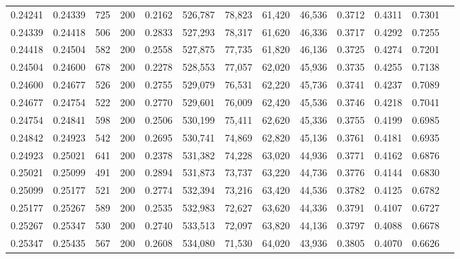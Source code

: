 \begin{tabular}{rrrrrrrrrrrrr}
0.24241 & 0.24339 &    725 & 200 &                                     0.2162 & 526,787 &  78,823 &  61,420 &  46,536 & 0.3712 & 0.4311 & 0.7301 \\
0.24339 & 0.24418 &    506 & 200 &                                     0.2833 & 527,293 &  78,317 &  61,620 &  46,336 & 0.3717 & 0.4292 & 0.7255 \\
0.24418 & 0.24504 &    582 & 200 &                                     0.2558 & 527,875 &  77,735 &  61,820 &  46,136 & 0.3725 & 0.4274 & 0.7201 \\
0.24504 & 0.24600 &    678 & 200 &                                     0.2278 & 528,553 &  77,057 &  62,020 &  45,936 & 0.3735 & 0.4255 & 0.7138 \\
0.24600 & 0.24677 &    526 & 200 &                                     0.2755 & 529,079 &  76,531 &  62,220 &  45,736 & 0.3741 & 0.4237 & 0.7089 \\
0.24677 & 0.24754 &    522 & 200 &                                     0.2770 & 529,601 &  76,009 &  62,420 &  45,536 & 0.3746 & 0.4218 & 0.7041 \\
0.24754 & 0.24841 &    598 & 200 &                                     0.2506 & 530,199 &  75,411 &  62,620 &  45,336 & 0.3755 & 0.4199 & 0.6985 \\
0.24842 & 0.24923 &    542 & 200 &                                     0.2695 & 530,741 &  74,869 &  62,820 &  45,136 & 0.3761 & 0.4181 & 0.6935 \\
0.24923 & 0.25021 &    641 & 200 &                                     0.2378 & 531,382 &  74,228 &  63,020 &  44,936 & 0.3771 & 0.4162 & 0.6876 \\
0.25021 & 0.25099 &    491 & 200 &                                     0.2894 & 531,873 &  73,737 &  63,220 &  44,736 & 0.3776 & 0.4144 & 0.6830 \\
0.25099 & 0.25177 &    521 & 200 &                                     0.2774 & 532,394 &  73,216 &  63,420 &  44,536 & 0.3782 & 0.4125 & 0.6782 \\
0.25177 & 0.25267 &    589 & 200 &                                     0.2535 & 532,983 &  72,627 &  63,620 &  44,336 & 0.3791 & 0.4107 & 0.6727 \\
0.25267 & 0.25347 &    530 & 200 &                                     0.2740 & 533,513 &  72,097 &  63,820 &  44,136 & 0.3797 & 0.4088 & 0.6678 \\
0.25347 & 0.25435 &    567 & 200 &                                     0.2608 & 534,080 &  71,530 &  64,020 &  43,936 & 0.3805 & 0.4070 & 0.6626 \\

\end{tabular}
